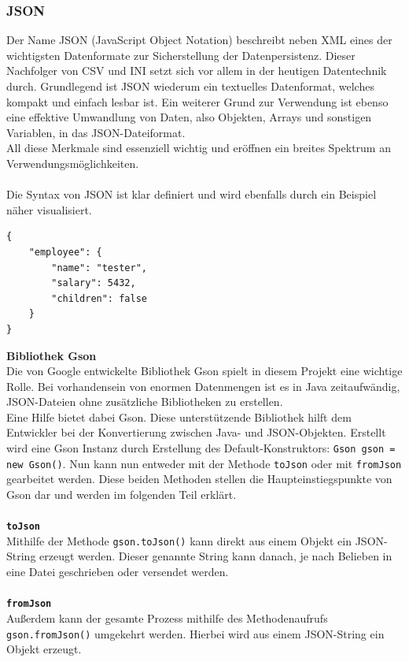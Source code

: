 \subsubsection{JSON}\label{sssec:json}
Der Name JSON (JavaScript Object Notation) beschreibt neben XML eines der wichtigsten Datenformate zur Sicherstellung der Datenpersistenz.
Dieser Nachfolger von \acs{CSV} und INI setzt sich vor allem in der heutigen Datentechnik durch.
Grundlegend ist JSON wiederum ein textuelles Datenformat, welches kompakt und einfach lesbar ist.
Ein weiterer Grund zur Verwendung ist ebenso eine effektive Umwandlung von Daten, also Objekten, Arrays und sonstigen Variablen, in das JSON-Dateiformat.\\
All diese Merkmale sind essenziell wichtig und eröffnen ein breites Spektrum an Verwendungsmöglichkeiten.\\\\
\newpage
Die Syntax von JSON ist klar definiert und wird ebenfalls durch ein Beispiel näher visualisiert.
\begin{lstlisting}[style=json, caption=JSON-Codebeispiel,label=jsonExample]
{
    "employee": {
        "name": "tester",
        "salary": 5432,
        "children": false
    }
}
\end{lstlisting}
\textbf{Bibliothek Gson}\\
Die von Google entwickelte Bibliothek Gson spielt in diesem Projekt eine wichtige Rolle.
Bei vorhandensein von enormen Datenmengen ist es in Java zeitaufwändig, JSON-Dateien ohne zusätzliche Bibliotheken zu erstellen.\\
Eine Hilfe bietet dabei Gson.
Diese unterstützende Bibliothek hilft dem Entwickler bei der Konvertierung zwischen Java- und JSON-Objekten.
Erstellt wird eine Gson Instanz durch Erstellung des Default-Konstruktors: \lstinline[style=java]{Gson gson = new Gson()}.
Nun kann nun entweder mit der Methode \lstinline{toJson} oder mit \lstinline{fromJson} gearbeitet werden.
Diese beiden Methoden stellen die Haupteinstiegspunkte von Gson dar und werden im folgenden Teil erklärt.
\\\\
\textbf{\lstinline{toJson}}
\\
Mithilfe der Methode \lstinline[style=java]{gson.toJson()} kann direkt aus einem Objekt ein JSON-String erzeugt werden.
Dieser genannte String kann danach, je nach Belieben in eine Datei geschrieben oder versendet werden.
\\\\
\textbf{\lstinline{fromJson}}
\\
Außerdem kann der gesamte Prozess mithilfe des Methodenaufrufs \lstinline[style=java]{gson.fromJson()} umgekehrt werden.
Hierbei wird aus einem JSON-String ein Objekt erzeugt.
\newpage
